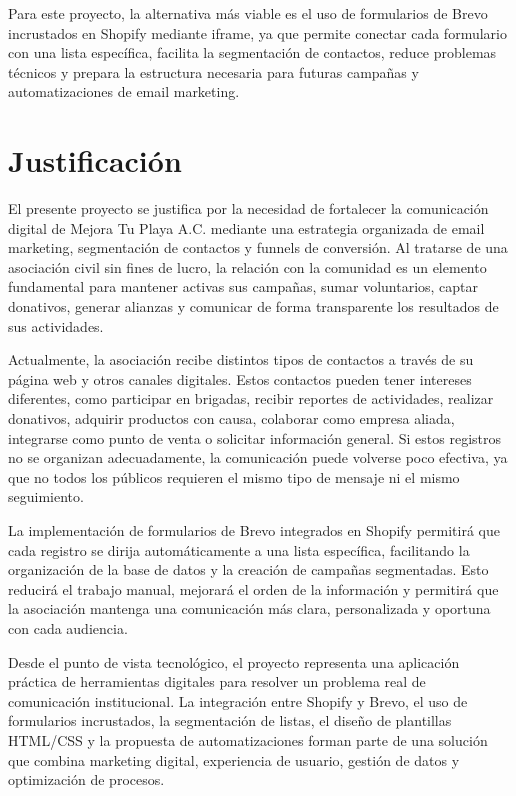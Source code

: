 Para este proyecto, la alternativa más viable es el uso de formularios de Brevo incrustados en Shopify mediante iframe, ya que permite conectar cada formulario con una lista específica, facilita la segmentación de contactos, reduce problemas técnicos y prepara la estructura necesaria para futuras campañas y automatizaciones de email marketing.

\section{Justificación}

El presente proyecto se justifica por la necesidad de fortalecer la comunicación digital de Mejora Tu Playa A.C. mediante una estrategia organizada de email marketing, segmentación de contactos y funnels de conversión. Al tratarse de una asociación civil sin fines de lucro, la relación con la comunidad es un elemento fundamental para mantener activas sus campañas, sumar voluntarios, captar donativos, generar alianzas y comunicar de forma transparente los resultados de sus actividades.

Actualmente, la asociación recibe distintos tipos de contactos a través de su página web y otros canales digitales. Estos contactos pueden tener intereses diferentes, como participar en brigadas, recibir reportes de actividades, realizar donativos, adquirir productos con causa, colaborar como empresa aliada, integrarse como punto de venta o solicitar información general. Si estos registros no se organizan adecuadamente, la comunicación puede volverse poco efectiva, ya que no todos los públicos requieren el mismo tipo de mensaje ni el mismo seguimiento.

La implementación de formularios de Brevo integrados en Shopify permitirá que cada registro se dirija automáticamente a una lista específica, facilitando la organización de la base de datos y la creación de campañas segmentadas. Esto reducirá el trabajo manual, mejorará el orden de la información y permitirá que la asociación mantenga una comunicación más clara, personalizada y oportuna con cada audiencia.

Desde el punto de vista tecnológico, el proyecto representa una aplicación práctica de herramientas digitales para resolver un problema real de comunicación institucional. La integración entre Shopify y Brevo, el uso de formularios incrustados, la segmentación de listas, el diseño de plantillas HTML/CSS y la propuesta de automatizaciones forman parte de una solución que combina marketing digital, experiencia de usuario, gestión de datos y optimización de procesos.

